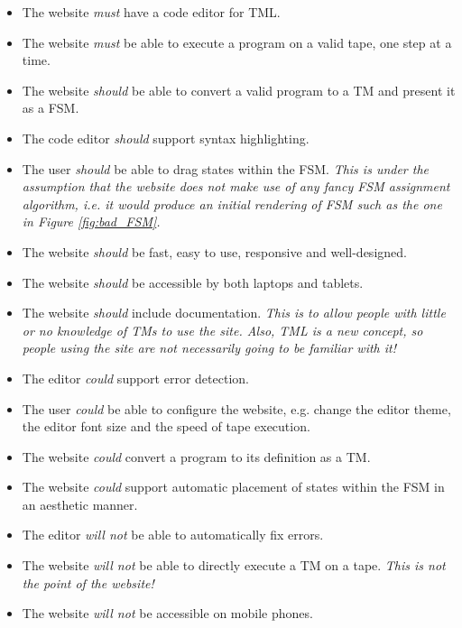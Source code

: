 \begin{itemize}
    \item The website \emph{must} have a code editor for TML.
    \item The website \emph{must} be able to execute a program on a valid tape, one step at a time.
    \item The website \emph{should} be able to convert a valid program to a TM and present it as a FSM.
    \item The code editor \emph{should} support syntax highlighting.
    \item The user \emph{should} be able to drag states within the FSM. \textit{This is under the assumption that the website does not make use of any fancy FSM assignment algorithm, i.e. it would produce an initial rendering of FSM such as the one in Figure \ref{fig:bad_FSM}.}
    \item The website \emph{should} be fast, easy to use, responsive and well-designed.
    \item The website \emph{should} be accessible by both laptops and tablets.
    \item The website \emph{should} include documentation. \textit{This is to allow people with little or no knowledge of TMs to use the site. Also, TML is a new concept, so people using the site are not necessarily going to be familiar with it!}
    \item The editor \emph{could} support error detection.
    \item The user \emph{could} be able to configure the website, e.g. change the editor theme, the editor font size and the speed of tape execution. 
    \item The website \emph{could} convert a program to its definition as a TM. 
    \item The website \emph{could} support automatic placement of states within the FSM in an aesthetic manner.
    \item The editor \emph{will not} be able to automatically fix errors.
    \item The website \emph{will not} be able to directly execute a TM on a tape. \textit{This is not the point of the website!}
    \item The website \emph{will not} be accessible on mobile phones.
\end{itemize}

